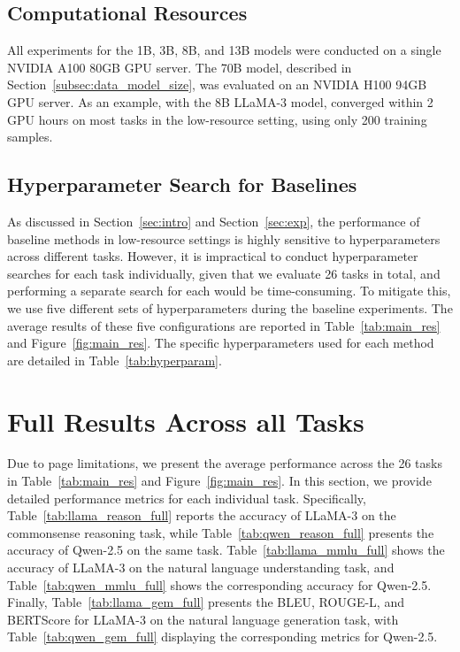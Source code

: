 \subsection{Computational Resources}
\label{appendix:comp_resource}
All experiments for the 1B, 3B, 8B, and 13B models were conducted on a single NVIDIA A100 80GB GPU server.
The 70B model, described in Section~\ref{subsec:data_model_size}, was evaluated on an NVIDIA H100 94GB GPU server.
As an example, with the 8B LLaMA-3 model, \jola{} converged within 2 GPU hours on most tasks in the low-resource setting, using only 200 training samples.

\subsection{Hyperparameter Search for Baselines}
\label{appendix:hyper_search}
As discussed in Section~\ref{sec:intro} and Section~\ref{sec:exp}, the performance of baseline methods in low-resource settings is highly sensitive to hyperparameters across different tasks.
However, it is impractical to conduct hyperparameter searches for each task individually, given that we evaluate 26 tasks in total, and performing a separate search for each would be time-consuming.
To mitigate this, we use five different sets of hyperparameters during the baseline experiments.
The average results of these five configurations are reported in Table~\ref{tab:main_res} and Figure~\ref{fig:main_res}.
The specific hyperparameters used for each method are detailed in Table~\ref{tab:hyperparam}.

\section{Full Results Across all Tasks}
\label{appendix:full_res}
Due to page limitations, we present the average performance across the 26 tasks in Table~\ref{tab:main_res} and Figure~\ref{fig:main_res}.
In this section, we provide detailed performance metrics for each individual task.
Specifically, Table~\ref{tab:llama_reason_full} reports the accuracy of LLaMA-3 on the commonsense reasoning task, while Table~\ref{tab:qwen_reason_full} presents the accuracy of Qwen-2.5 on the same task.
Table~\ref{tab:llama_mmlu_full} shows the accuracy of LLaMA-3 on the natural language understanding task, and Table~\ref{tab:qwen_mmlu_full} shows the corresponding accuracy for Qwen-2.5.
Finally, Table~\ref{tab:llama_gem_full} presents the BLEU, ROUGE-L, and BERTScore for LLaMA-3 on the natural language generation task, with Table~\ref{tab:qwen_gem_full} displaying the corresponding metrics for Qwen-2.5.

